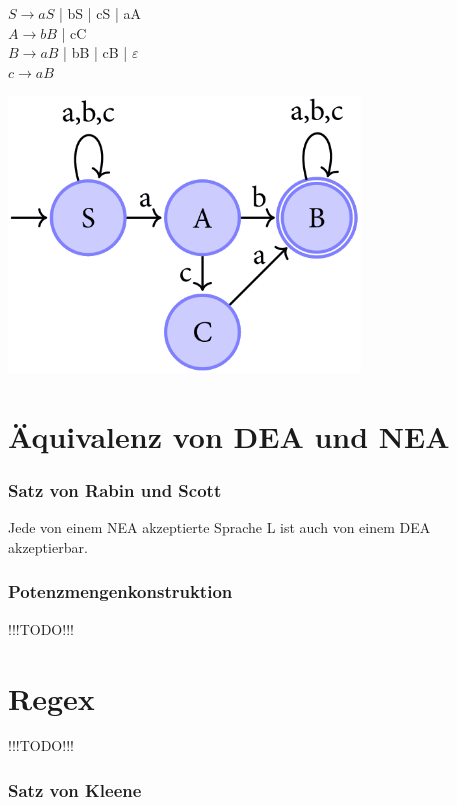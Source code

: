 \documentclass[11pt, a4paper]{scrartcl}
\begin{document}
\begin{minipage}[h]{0.45\textwidth}
    $S \rightarrow aS$ | bS | cS | aA \\
    $A \rightarrow bB$ | cC \\
    $B \rightarrow aB$ | bB | cB | $\varepsilon$ \\
    $c \rightarrow aB$
\end{minipage}
\begin{minipage}[h]{0.45\textwidth}
    \includegraphics[width=0.7\textwidth]{NEA-00.png}
\end{minipage}

\newpage

\section{Äquivalenz von DEA und NEA}

\subsubsection{Satz von Rabin und Scott}

Jede von einem NEA akzeptierte Sprache L ist auch von einem DEA akzeptierbar.

\subsubsection{Potenzmengenkonstruktion}

!!!TODO!!!

\newpage

\section{Regex}

!!!TODO!!!

\subsubsection{Satz von Kleene}
\end{document}
